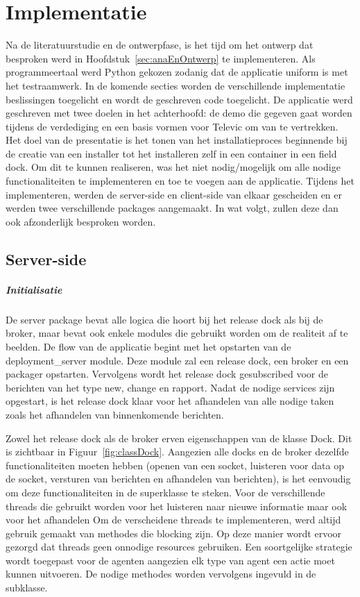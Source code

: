 \chapter{Implementatie}
Na de literatuurstudie en de ontwerpfase, is het tijd om het ontwerp dat besproken werd in Hoofdstuk~\vref{sec:anaEnOntwerp} te implementeren.
Als programmeertaal werd Python gekozen zodanig dat de applicatie uniform is met het testraamwerk.
In de komende secties worden de verschillende implementatie beslissingen toegelicht en wordt de geschreven code toegelicht.
De applicatie werd geschreven met twee doelen in het achterhoofd: de demo die gegeven gaat worden tijdens de verdediging en een basis vormen voor Televic om van te vertrekken.
Het doel van de presentatie is het tonen van het installatieproces beginnende bij de creatie van een installer tot het installeren zelf in een container in een field dock.
Om dit te kunnen realiseren, was het niet nodig/mogelijk om alle nodige functionaliteiten te implementeren en toe te voegen aan de applicatie.
Tijdens het implementeren, werden de server-side en client-side van elkaar gescheiden en er werden twee verschillende packages aangemaakt.
In wat volgt, zullen deze dan ook afzonderlijk besproken worden.

\section{Server-side}
\paragraph{Initialisatie} 
De server package bevat alle logica die hoort bij het release dock als bij de broker, maar bevat ook enkele modules die gebruikt worden om de realiteit af te beelden.
De flow van de applicatie begint met het opstarten van de deployment\_server module.
Deze module zal een release dock, een broker en een packager opstarten.
Vervolgens wordt het release dock gesubscribed voor de berichten van het type new, change en rapport.
Nadat de nodige services zijn opgestart, is het release dock klaar voor het afhandelen van alle nodige taken zoals het afhandelen van binnenkomende berichten.

Zowel het release dock als de broker erven eigenschappen van de klasse Dock.
Dit is zichtbaar in Figuur~\vref{fig:classDock}.
Aangezien alle docks en de broker dezelfde functionaliteiten moeten hebben (openen van een socket, luisteren voor data op de socket, versturen van berichten en afhandelen van berichten), is het eenvoudig om deze functionaliteiten in de superklasse te steken.
Voor de verschillende threads die gebruikt worden voor het luisteren naar nieuwe informatie maar ook voor het afhandelen Om de verscheidene threads te implementeren, werd altijd gebruik gemaakt van methodes die blocking zijn.
Op deze manier wordt ervoor gezorgd dat threads geen onnodige resources gebruiken.
Een soortgelijke strategie wordt toegepast voor de agenten aangezien elk type van agent een actie moet kunnen uitvoeren.
De nodige methodes worden vervolgens ingevuld in de subklasse. 


